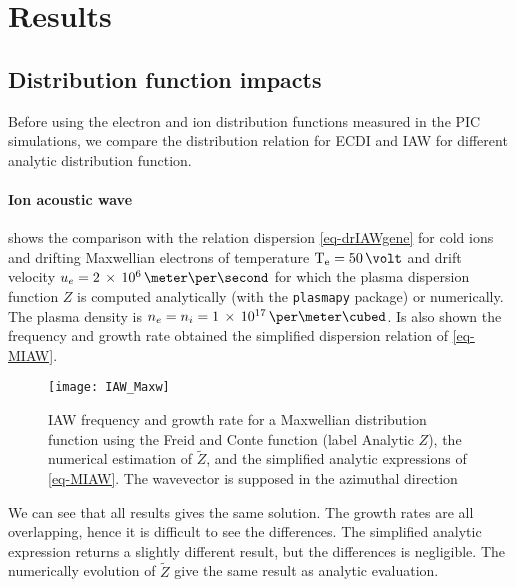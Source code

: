 
\section{Results}
  \label{sec-DR-results}
  
  
  \subsection{Distribution function impacts} \label{subsec-DRimpact}
  Before using the electron and ion distribution functions measured in the \ac{PIC} simulations, we compare the distribution relation for \ac{ECDI} and \ac{IAW} for different analytic distribution function.
  
  \paragraph{Ion acoustic wave\\}
  
   shows the comparison with the relation dispersion \cref{eq-drIAWgene} for cold ions and drifting Maxwellian electrons of temperature $\Te=50\,\volt$ and drift velocity $u_e = \sn{2}{6} \,\meter\per\second$ for which the plasma dispersion function $Z$ is computed analytically (with the \texttt{plasmapy} package) or numerically.
  The plasma density is $n_e = n_i = \sn{1}{17} \,\per\meter\cubed$.
  Is also shown the frequency and growth rate obtained the simplified dispersion relation of \cref{eq-MIAW}. 
  
  \begin{figure}[hbtp]
    \centering
    \texttt{[image: IAW\_Maxw]}
    \caption{\ac{IAW} frequency and growth rate for a Maxwellian distribution function using the Freid and Conte function (label Analytic $Z$), the numerical estimation of $\tilde{Z}$, and the simplified analytic expressions of \cref{eq-MIAW}. The wavevector is supposed in the azimuthal direction }
    \label{fig-IAW_Maxw}
  \end{figure}
  
  We can see that all results gives the same solution.
  The growth rates are all overlapping, hence it is difficult to see the differences.
  The simplified analytic expression returns a slightly different result, but the differences is negligible.
  The numerically evolution of $\tilde{Z}$ give the same result as analytic evaluation.
  
